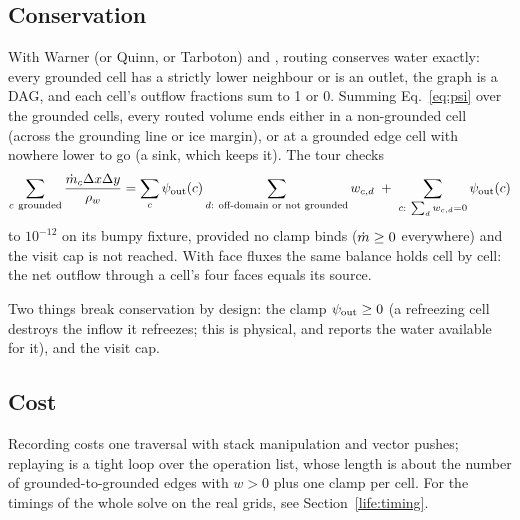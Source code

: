 \subsection{Conservation}\label{rt:conservation}
With Warner (or Quinn, or Tarboton) and , routing conserves water exactly: every grounded cell has a strictly lower
neighbour or is an outlet, the graph is a DAG, and each cell's outflow fractions sum to 1 or 0. Summing Eq.~\eqref{eq:psi}
over the grounded cells, every routed volume ends either in a non-grounded cell (across the grounding line or ice margin),
or at a grounded edge cell with nowhere lower to go (a sink, which keeps it). The tour checks
\[
\sum_{c\ \rm grounded} \frac{\dot m_c\Delta x\Delta y}{{\rho_w}}
= \sum_{c} {\psi_{\rm out}}(c)\sum_{d:\ \text{off-domain or not grounded}} w_{c,d} \;+\; \sum_{c:\ \sum_d w_{c,d} = 0}{\psi_{\rm out}}(c)
\]
to $10^{-12}$ on its bumpy fixture, provided no clamp binds ($\dot m\ge0$ everywhere) and the visit cap is not reached. With
face fluxes the same balance holds cell by cell: the net outflow through a cell's four faces equals its source.

Two things break conservation by design: the clamp ${\psi_{\rm out}}\ge0$ (a refreezing cell destroys the inflow it refreezes; this
is physical, and  reports the water available for it), and the visit cap.

\subsection{Cost}\label{rt:cost}
Recording costs one traversal with stack manipulation and vector pushes; replaying is a tight loop over the operation list,
whose length is about the number of grounded-to-grounded edges with $w>0$ plus one clamp per cell. For the timings of the
whole solve on the real grids, see Section~\ref{life:timing}.
